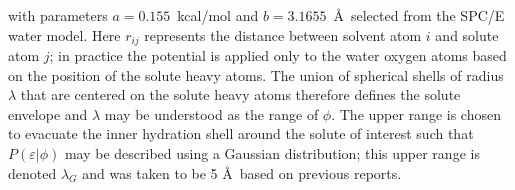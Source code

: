 \documentclass[journal=jacsat,articletitle=true,manuscript=suppinfo,layout=onecolumn]{achemso}
\begin{document}
    with parameters $a = 0.155$~kcal/mol and $b = 3.1655$~\AA\ selected from the SPC/E water model.\cite{Berendsen1987, Chatterjee2008} Here $r_{ij}$ represents the distance between solvent atom $i$ and solute atom $j$; in practice the potential is applied only to the water oxygen atoms based on the position of the solute heavy atoms. The union of spherical shells of radius $\lambda$ that are centered on the solute heavy atoms therefore defines the solute envelope and $\lambda$ may be understood as the range of $\phi$. The upper range is chosen to evacuate the inner hydration shell around the solute of interest such that $P(\varepsilon|\phi)$ may be described using a Gaussian distribution; this upper range is denoted $\lambda_G$ and was taken to be 5 \AA\ based on previous reports. \cite{Asthagiri2017, Adhikari2022}
\end{document}
